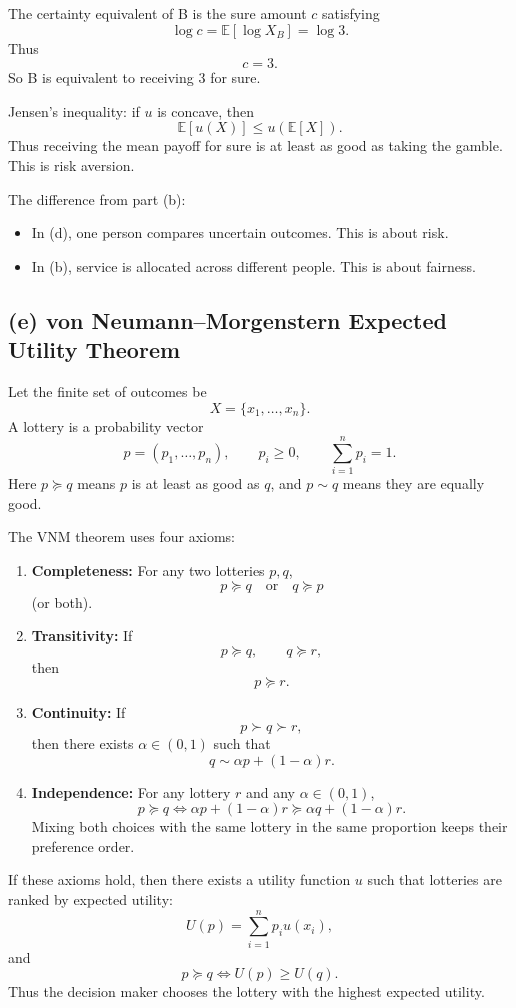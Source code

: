 \documentclass[11pt,a4paper]{article}
\begin{document}
The certainty equivalent of B is the sure amount \(c\) satisfying
\[
\log c=\mathbb E[\log X_B]=\log 3.
\]
Thus
\[
c=3.
\]
So B is equivalent to receiving \(3\) for sure.

Jensen's inequality: if \(u\) is concave, then
\[
\mathbb E[u(X)]\le u(\mathbb E[X]).
\]
Thus receiving the mean payoff for sure is at least as good as taking the
gamble. This is risk aversion.

The difference from part (b):
\begin{itemize}
\item In (d), one person compares uncertain outcomes. This is about risk.
\item In (b), service is allocated across different people. This is about fairness.
\end{itemize}

\subsection*{(e) von Neumann--Morgenstern Expected Utility Theorem}

Let the finite set of outcomes be
\[
X=\{x_1,\dots,x_n\}.
\]
A lottery is a probability vector
\[
p=(p_1,\dots,p_n),\qquad p_i\ge 0,\qquad \sum_{i=1}^n p_i=1.
\]
Here \(p\succeq q\) means \(p\) is at least as good as \(q\), and
\(p\sim q\) means they are equally good.

The VNM theorem uses four axioms:

\begin{enumerate}
\item \textbf{Completeness:} For any two lotteries \(p,q\),
\[
p\succeq q \quad\text{or}\quad q\succeq p
\]
(or both).

\item \textbf{Transitivity:} If
\[
p\succeq q,\qquad q\succeq r,
\]
then
\[
p\succeq r.
\]

\item \textbf{Continuity:} If
\[
p\succ q\succ r,
\]
then there exists \(\alpha\in(0,1)\) such that
\[
q\sim \alpha p+(1-\alpha)r.
\]

\item \textbf{Independence:} For any lottery \(r\) and any
\(\alpha\in(0,1)\),
\[
p\succeq q
\iff
\alpha p+(1-\alpha)r\succeq\alpha q+(1-\alpha)r.
\]
Mixing both choices with the same lottery in the same proportion keeps
their preference order.
\end{enumerate}

If these axioms hold, then there exists a utility function \(u\) such that
lotteries are ranked by expected utility:
\[
U(p)=\sum_{i=1}^n p_i u(x_i),
\]
and
\[
p\succeq q \iff U(p)\ge U(q).
\]
Thus the decision maker chooses the lottery with the highest expected
utility.
\end{document}
